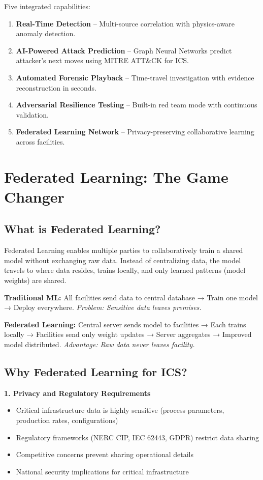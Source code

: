 \documentclass[12pt,a4paper]{article}
\begin{document}
Five integrated capabilities:
\begin{enumerate}[label=\textbf{\arabic*.},itemsep=0pt]
    \item \textbf{Real-Time Detection} – Multi-source correlation with physics-aware anomaly detection.
    \item \textbf{AI-Powered Attack Prediction} – Graph Neural Networks predict attacker's next moves using MITRE ATT\&CK for ICS.
    \item \textbf{Automated Forensic Playback} – Time-travel investigation with evidence reconstruction in seconds.
    \item \textbf{Adversarial Resilience Testing} – Built-in red team mode with continuous validation.
    \item \textbf{Federated Learning Network} – Privacy-preserving collaborative learning across facilities.
\end{enumerate}

\section{Federated Learning: The Game Changer}

\subsection{What is Federated Learning?}
Federated Learning enables multiple parties to collaboratively train a shared model without exchanging raw data.
Instead of centralizing data, the model travels to where data resides, trains locally, and only learned patterns (model weights) are shared.

\textbf{Traditional ML:} All facilities send data to central database → Train one model → Deploy everywhere. \textit{Problem: Sensitive data leaves premises.}

\textbf{Federated Learning:} Central server sends model to facilities → Each trains locally → Facilities send only weight updates → Server aggregates → Improved model distributed. \textit{Advantage: Raw data never leaves facility.}

\subsection{Why Federated Learning for ICS?}

\textbf{1. Privacy and Regulatory Requirements}
\begin{itemize}[leftmargin=1cm,itemsep=0pt]
    \item Critical infrastructure data is highly sensitive (process parameters, production rates, configurations)
    \item Regulatory frameworks (NERC CIP, IEC 62443, GDPR) restrict data sharing
    \item Competitive concerns prevent sharing operational details
    \item National security implications for critical infrastructure
\end{itemize}
\end{document}
